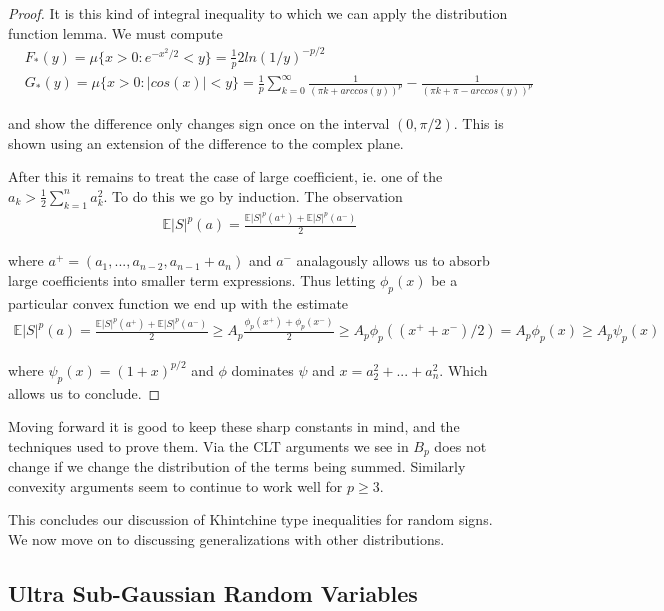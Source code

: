 \documentclass[10pt]{article}
\newcommand{\E}{\mathbb{E}}
\newcommand{\1}{\textbf{1}}
\theoremstyle{remark}
\theoremstyle{definition}
\begin{document}
\begin{proof}
	It is this kind of integral inequality to which we can apply the distribution function lemma. We must compute
	\begin{align*}
		&F_*(y) = \mu\{x > 0 : e^{-x^2/2} < y\} = \frac{1}{p}2ln(1/y)^{-p/2}\\
		&G_*(y) = \mu\{x > 0: |cos(x)| < y\} = \frac{1}{p}\sum_{k=0}^{\infty}\frac{1}{(\pi k + arccos(y))^p} - \frac{1}{(\pi k + \pi - arccos(y))^p}
	\end{align*}

	and show the difference only changes sign once on the interval $(0,\pi/2)$. This is shown using an extension of the difference to the complex plane.

	After this it remains to treat the case of large coefficient, ie. one of the $a_k > \frac{1}{2}\sum_{k=1}^na_k^2$. To do this we go by induction. The observation
	\begin{align*}
		\E|S|^p(a) = \frac{\E|S|^p(a^+) + \E|S|^p(a^-)}{2}
	\end{align*}

	where $a^+ = (a_1,...,a_{n-2},a_{n-1}+a_n)$ and $a^-$ analagously allows us to absorb large coefficients into smaller term expressions. Thus letting $\phi_p(x)$ be a particular convex function we end up with the estimate
	\begin{align*}
		\E|S|^p(a) = \frac{\E|S|^p(a^+) + \E|S|^p(a^-)}{2} \geq A_p \frac{\phi_p(x^+)+\phi_p(x^-)}{2} \geq A_p\phi_p((x^++x^-)/2) = A_p \phi_p(x) \geq A_p \psi_p(x)
	\end{align*}

	where $\psi_p(x) = (1+x)^{p/2}$ and $\phi$ dominates $\psi$ and $x = a_2^2 + ... + a_n^2$. Which allows us to conclude.

\end{proof}

Moving forward it is good to keep these sharp constants in mind, and the techniques used to prove them. Via the CLT arguments we see in $B_p$ does not change if we change the distribution of the terms being summed. Similarly convexity arguments seem to continue to work well for $p \geq 3$. 

This concludes our discussion of Khintchine type inequalities for random signs. We now move on to discussing generalizations with other distributions.

\subsection{Ultra Sub-Gaussian Random Variables}
\end{document}
